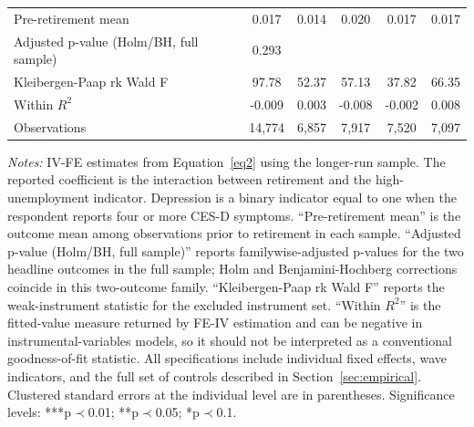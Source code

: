 \documentclass[arguments, manuscript, 11pt]{aastex631}
\begin{document}
\begin{table}[!htbp]
{\begin{tabular}{@{}lccccc@{}}
Pre-retirement mean & 0.017 & 0.014 & 0.020 & 0.017 & 0.017 \\
Adjusted p-value (Holm/BH, full sample) & 0.293 &  &  &  &  \\
Kleibergen-Paap rk Wald F & 97.78 & 52.37 & 57.13 & 37.82 & 66.35 \\
Within $R^2$ & -0.009 & 0.003 & -0.008 & -0.002 & 0.008 \\
Observations & 14,774 & 6,857 & 7,917 & 7,520 & 7,097 \\ \bottomrule
\end{tabular}%
}
\tiny{{\singlespacing \emph{Notes:} IV-FE estimates from Equation~\ref{eq2} using the longer-run sample. The reported coefficient is the interaction between retirement and the high-unemployment indicator. Depression is a binary indicator equal to one when the respondent reports four or more CES-D symptoms. ``Pre-retirement mean'' is the outcome mean among observations prior to retirement in each sample. ``Adjusted p-value (Holm/BH, full sample)'' reports familywise-adjusted p-values for the two headline outcomes in the full sample; Holm and Benjamini-Hochberg corrections coincide in this two-outcome family. ``Kleibergen-Paap rk Wald F'' reports the weak-instrument statistic for the excluded instrument set. ``Within $R^2$'' is the fitted-value measure returned by FE-IV estimation and can be negative in instrumental-variables models, so it should not be interpreted as a conventional goodness-of-fit statistic. All specifications include individual fixed effects, wave indicators, and the full set of controls described in Section~\ref{sec:empirical}. Clustered standard errors at the individual level are in parentheses. Significance levels: ***p$\prec$0.01; **p$\prec$0.05; *p$\prec$0.1.}}
\end{table}

\FloatBarrier
\end{document}
